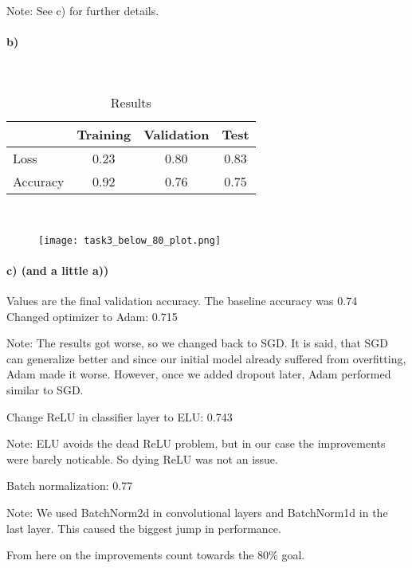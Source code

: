 \documentclass{article}
\begin{document}
Note: See c) for further details.
\newpage
\paragraph{b)}
\

\begin{table}[h!]
	\centering
	\caption{Results}
	\begin{tabular}[t]{lccc}
		\hline
		         & Training & Validation & Test \\
		\hline
		Loss     & 0.23     & 0.80       & 0.83 \\
		Accuracy & 0.92     & 0.76       & 0.75 \\
		\hline
	\end{tabular}
\end{table}%
\

\begin{figure}[h!]
	\centering
	\texttt{[image: task3\_below\_80\_plot.png]}\label{hellonow}
\end{figure}


\paragraph{c) (and a little a))}


Values are the final validation accuracy. The baseline accuracy was 0.74\\


\indent Changed optimizer to Adam: 0.715\\
\begin{adjustwidth}{1.2cm}{0pt}
	Note: The results got worse, so we changed back to SGD. It is said, that SGD can generalize better and since our initial model already suffered from overfitting, Adam made it worse. However, once we added dropout later, Adam performed similar to SGD. \\
\end{adjustwidth}
\indent Change ReLU in classifier layer to ELU: 0.743\\
\begin{adjustwidth}{1.2cm}{0pt}
	Note: ELU avoids the dead ReLU problem, but in our case the improvements were barely noticable. So dying ReLU was not an issue.\\
\end{adjustwidth}
\indent Batch normalization: 0.77\\
\begin{adjustwidth}{1.2cm}{0pt}
	Note: We used BatchNorm2d in convolutional layers and BatchNorm1d in the last layer. This caused the biggest jump in performance.\\
\end{adjustwidth}
From here on the improvements count towards the 80\% goal.
\end{document}
